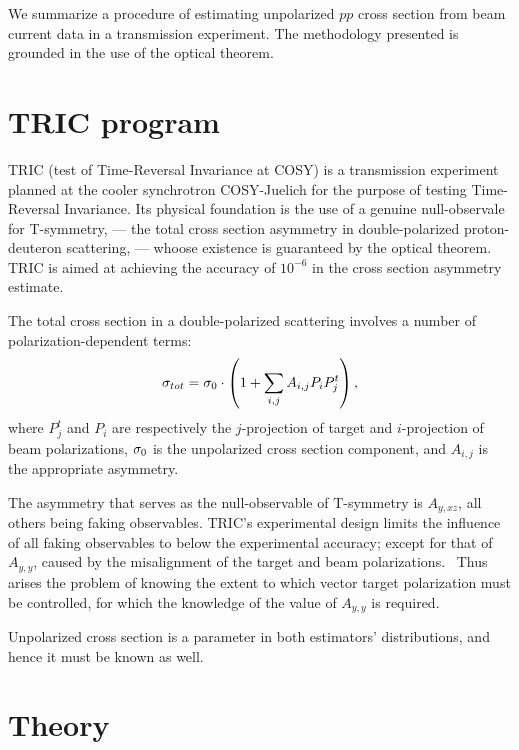 \documentclass[reprint]{revtex4-1}
\begin{document}
\begin{abstractname}
We summarize a procedure of estimating unpolarized $pp$ cross section from beam current data in a transmission experiment. The methodology presented is grounded in the use of the optical theorem.
\end{abstractname}

\section{TRIC program}

TRIC (test of Time-Reversal Invariance at COSY) is a transmission experiment planned at the cooler synchrotron COSY-Juelich for the purpose of testing Time-Reversal Invariance. Its physical foundation is the use of a genuine null-observale for T-symmetry, --- the total cross section asymmetry in double-polarized proton-deuteron scattering, --- whoose existence is guaranteed by the optical theorem.~\cite{Conzett} TRIC is aimed at achieving the accuracy of $10^{-6}$ in the cross section asymmetry estimate.

The total cross section in a double-polarized scattering involves a number of polarization-dependent terms:
\[
	\CS[tot] = \CS[0]\cdot\bkt{1 + \sum_{i,j} A_{i,j} P_iP^t_j},
\]
where $P^t_j$ and $P_i$ are respectively the $j$-projection of target and $i$-projection of beam polarizations, $\CS[0]$ is the unpolarized cross section component, and $A_{i,j}$ is the appropriate asymmetry.

The asymmetry that serves as the null-observable of T-symmetry is $A_{y,xz}$, all others being faking observables. TRIC's experimental design limits the influence of all faking observables to below the experimental accuracy; except for that of $A_{y,y}$, caused by the misalignment of the target and beam polarizations.~\cite[p. 11]{Proposal} Thus arises the problem of knowing the extent to which vector target polarization must be controlled, for which the knowledge of the value of $A_{y,y}$ is required. 

Unpolarized cross section is a parameter in both estimators' distributions, and hence it must be known as well. 

\section{Theory}
\end{document}
